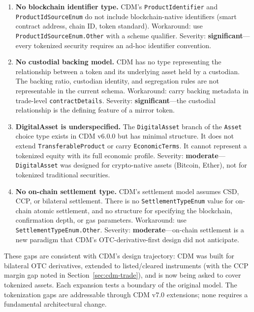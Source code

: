 \documentclass[11pt,a4paper]{article}
\begin{document}
\begin{enumerate}
\item \textbf{No blockchain identifier type.} CDM's \texttt{ProductIdentifier} and \texttt{ProductIdSourceEnum} do not include blockchain-native identifiers (smart contract address, chain ID, token standard). Workaround: use \texttt{ProductIdSourceEnum.Other} with a scheme qualifier. Severity: \textbf{significant}---every tokenized security requires an ad-hoc identifier convention.

\item \textbf{No custodial backing model.} CDM has no type representing the relationship between a token and its underlying asset held by a custodian. The backing ratio, custodian identity, and segregation rules are not representable in the current schema. Workaround: carry backing metadata in trade-level \texttt{contractDetails}. Severity: \textbf{significant}---the custodial relationship is the defining feature of a mirror token.

\item \textbf{DigitalAsset is underspecified.} The \texttt{DigitalAsset} branch of the \texttt{Asset} choice type exists in CDM v6.0.0 but has minimal structure. It does not extend \texttt{TransferableProduct} or carry \texttt{EconomicTerms}. It cannot represent a tokenized equity with its full economic profile. Severity: \textbf{moderate}---\texttt{DigitalAsset} was designed for crypto-native assets (Bitcoin, Ether), not for tokenized traditional securities.

\item \textbf{No on-chain settlement type.} CDM's settlement model assumes CSD, CCP, or bilateral settlement. There is no \texttt{SettlementTypeEnum} value for on-chain atomic settlement, and no structure for specifying the blockchain, confirmation depth, or gas parameters. Workaround: use \texttt{SettlementTypeEnum.Other}. Severity: \textbf{moderate}---on-chain settlement is a new paradigm that CDM's OTC-derivative-first design did not anticipate.
\end{enumerate}

\noindent These gaps are consistent with CDM's design trajectory: CDM was built for bilateral OTC derivatives, extended to listed/cleared instruments (with the CCP margin gap noted in Section~\ref{sec:cdm-trade}), and is now being asked to cover tokenized assets. Each expansion tests a boundary of the original model. The tokenization gaps are addressable through CDM v7.0 extensions; none requires a fundamental architectural change.
\end{document}
